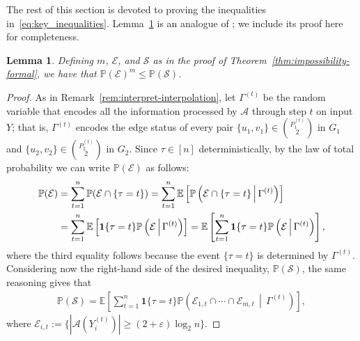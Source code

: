 \documentclass[11pt]{article}
\theoremstyle{plain}
\newtheorem{lemma}{Lemma}
\theoremstyle{definition}
\theoremstyle{remark}
\newcommand{\E}{\mathbb{E}}
\newcommand{\eps}{\varepsilon}
\newcommand{\Alg}{\mathcal{A}}
\newcommand{\findOneLarge}{\mathcal{E}}
\newcommand{\findManyLarge}{\mathcal{S}}
\renewcommand{\Pr}{\mathbb{P}}
\begin{document}
The rest of this section is devoted to proving the inequalities in~\eqref{eq:key_inequalities}. 
Lemma~\ref{lem:S-below} is an analogue of \cite[Lemma~4.6]{GKW25}; we include its proof here for completeness.
\begin{lemma}\label{lem:S-below}
    Defining $m$, $\findOneLarge$, and $\findManyLarge$ as in the proof of Theorem~\ref{thm:impossibility-formal}, we have that $\Pr(\findOneLarge)^m \leq \Pr(\findManyLarge)$.
\end{lemma}
\begin{proof}
    As in Remark~\ref{rem:interpret-interpolation}, let $\Gamma^{(t)}$ be the random variable that encodes all the information processed by $\Alg$ through step $t$ on input $Y$; that is, $\Gamma^{(t)}$ encodes the edge status of every pair $\{u_1, v_1\} \in \binom{P_1^{(t)}}{2}$ in $G_{1}$ and $\{u_2, v_2\} \in \binom{P_2^{(t)}}{2}$ in $G_{2}$. Since $\tau \in [n]$ deterministically, by the law of total probability we can write $\Pr(\findOneLarge)$ as follows:
    \begin{align}
        \Pr(\findOneLarge) 
        &= \sum_{t = 1}^n \Pr(\findOneLarge \cap \{\tau = t\}) %
        = \sum_{t = 1}^n \E\left[\Pr\left(\findOneLarge \cap \{\tau = t\} \, \middle| \, \Gamma^{(t)}\right)\right] \notag \\
        &= \sum_{t = 1}^n \E\left[\mathbf{1}{\{\tau = t\}}\Pr\left(\findOneLarge \, \middle| \, \Gamma^{(t)}\right)\right] %
        = \E\left[\sum_{t = 1}^n \mathbf{1}{\{\tau = t\}}\Pr\left(\findOneLarge \, \middle| \, \Gamma^{(t)}\right)\right], \notag
    \end{align}
    where the third equality follows because the event $\{\tau = t\}$ is determined by $\Gamma^{(t)}$. Considering now the right-hand side of the desired inequality, $\Pr(\findManyLarge)$, the same reasoning gives that 
    \begin{align*}
        \Pr(\findManyLarge) = \E\left[\sum_{t = 1}^n \mathbf{1}{\{\tau = t\}} \Pr\left(\findOneLarge_{1,t} \cap \cdots \cap \findOneLarge_{m,t} \, \middle| \, \Gamma^{(t)}\right)\right],
    \end{align*}
    where $\findOneLarge_{i, t} := \{|\Alg(Y_i^{(t)})| \geq (2 + \eps) \log_2 n\}$. 
    

\end{proof}
\end{document}
